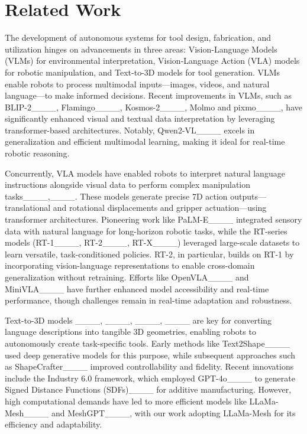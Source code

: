 \section{Related Work}
The development of autonomous systems for tool design, fabrication, and utilization hinges on advancements in three areas: Vision-Language Models (VLMs) for environmental interpretation, Vision-Language Action (VLA) models for robotic manipulation, and Text-to-3D models for tool generation. VLMs enable robots to process multimodal inputs—images, videos, and natural language—to make informed decisions. Recent improvements in VLMs, such as BLIP-2____, Flamingo____, Kosmos-2____, Molmo and pixmo____, have significantly enhanced visual and textual data interpretation by leveraging transformer-based architectures. Notably, Qwen2-VL____ excels in generalization and efficient multimodal learning, making it ideal for real-time robotic reasoning.

Concurrently, VLA models have enabled robots to interpret natural language instructions alongside visual data to perform complex manipulation tasks____,____. These models generate precise 7D action outputs—translational and rotational displacements and gripper actuation—using transformer architectures. Pioneering work like PaLM-E____ integrated sensory data with natural language for long-horizon robotic tasks, while the RT-series models (RT-1____, RT-2____, RT-X____) leveraged large-scale datasets to learn versatile, task-conditioned policies. RT-2, in particular, builds on RT-1 by incorporating vision-language representations to enable cross-domain generalization without retraining. Efforts like OpenVLA____ and MiniVLA____ have further enhanced model accessibility and real-time performance, though challenges remain in real-time adaptation and robustness.

Text-to-3D models ____, ____, ____, ____ are key for converting language descriptions into tangible 3D geometries, enabling robots to autonomously create task-specific tools. Early methods like Text2Shape____ used deep generative models for this purpose, while subsequent approaches such as ShapeCrafter____ improved controllability and fidelity. Recent innovations include the Industry 6.0 framework, which employed GPT-4o____ to generate Signed Distance Functions (SDFs)____ for additive manufacturing. However, high computational demands have led to more efficient models like LLaMa-Mesh____ and MeshGPT____, with our work adopting LLaMa-Mesh for its efficiency and adaptability.

